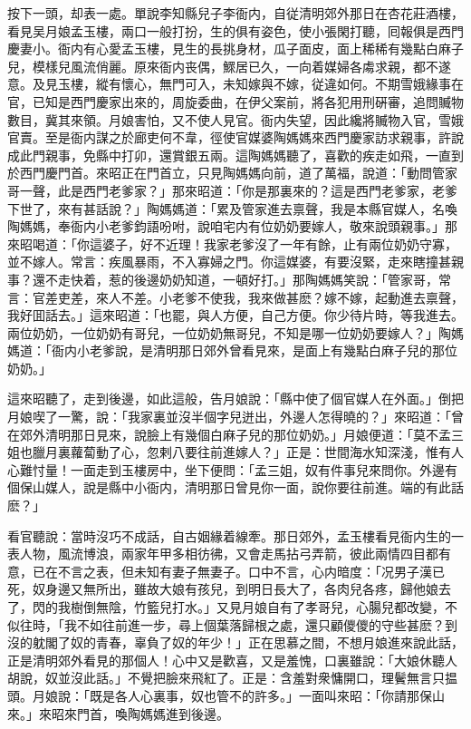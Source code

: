 按下一頭，却表一處。單說李知縣兒子李衙内，自従清明郊外那日在杏花莊酒樓，看見吴月娘孟玉樓，兩口一般打扮，生的俱有姿色，使小張閑打聽，囘報俱是西門慶妻小。衙内有心愛孟玉樓，見生的長挑身材，瓜子面皮，面上稀稀有幾點白麻子兒，模樣兒風流俏麗。原來衙内丧偶，鰥居已久，一向着媒婦各䖏求親，都不遂意。及見玉樓，縱有懷心，無門可入，未知嫁與不嫁，従違如何。不期雪娥緣事在官，已知是西門慶家出來的，周旋委曲，在伊父案前，將各犯用刑硏審，追問贓物數目，冀其來領。月娘害怕，又不使人見官。衙内失望，因此纔將贓物入官，雪娥官賣。至是衙内謀之於廊吏何不韋，徑使官媒婆陶媽媽來西門慶家訪求親事，許說成此門親事，免縣中打卯，還賞銀五兩。這陶媽媽聽了，喜歡的疾走如飛，一直到於西門慶門首。來昭正在門首立，只見陶媽媽向前，道了萬福，說道：「動問管家哥一聲，此是西門老爹家？」那來昭道：「你是那裏來的？這是西門老爹家，老爹下世了，來有甚話說？」陶媽媽道：「累及管家進去禀聲，我是本縣官媒人，名喚陶媽媽，奉衙内小老爹鈞語吩咐，說咱宅内有位奶奶要嫁人，敬來說頭親事。」那來昭喝道：「你這婆子，好不近理！我家老爹沒了一年有餘，止有兩位奶奶守寡，並不嫁人。常言：疾風暴雨，不入寡婦之門。你這媒婆，有要沒緊，走來瞎撞甚親事？還不走快着，惹的後邊奶奶知道，一頓好打。」那陶媽媽笑說：「管家哥，常言：官差吏差，來人不差。小老爹不使我，我來做甚麽？嫁不嫁，起動進去禀聲，我好囬話去。」這來昭道：「也罷，與人方便，自己方便。你少待片時，等我進去。兩位奶奶，一位奶奶有哥兒，一位奶奶無哥兒，不知是哪一位奶奶要嫁人？」陶媽媽道：「衙内小老爹說，是清明那日郊外曾看見來，是面上有幾點白麻子兒的那位奶奶。」

這來昭聽了，走到後邊，如此這般，告月娘說：「縣中使了個官媒人在外面。」倒把月娘喫了一驚，說：「我家裏並沒半個字兒迸出，外邊人怎得曉的？」來昭道：「曾在郊外清明那日見來，說臉上有幾個白麻子兒的那位奶奶。」月娘便道：「莫不孟三姐也臘月裏蘿蔔動了心，忽剌八要往前進嫁人？」正是：世間海水知深淺，惟有人心難忖量！一面走到玉樓房中，坐下便問：「孟三姐，奴有件事兒來問你。外邊有個保山媒人，說是縣中小衙内，清明那日曾見你一面，說你要往前進。端的有此話麽？」

看官聽說：當時沒巧不成話，自古姻緣着線牽。那日郊外，孟玉樓看見衙内生的一表人物，風流博浪，兩家年甲多相彷彿，又會走馬拈弓弄箭，彼此兩情四目都有意，已在不言之表，但未知有妻子無妻子。口中不言，心内暗度：「况男子漢已死，奴身邊又無所出，雖故大娘有孩兒，到明日長大了，各肉兒各疼，歸他娘去了，閃的我樹倒無陰，竹籃兒打水。」又見月娘自有了孝哥兒，心腸兒都改變，不似往時，「我不如往前進一步，尋上個葉落歸根之處，還只顧儍儍的守些甚麽？到沒的躭閣了奴的青春，辜負了奴的年少！」正在思慕之間，不想月娘進來說此話，正是清明郊外看見的那個人！心中又是歡喜，又是羞愧，口裏雖說：「大娘休聽人胡說，奴並沒此話。」不覺把臉來飛紅了。正是：含羞對衆慵開口，理鬢無言只揾頭。月娘說：「既是各人心裏事，奴也管不的許多。」一面叫來昭：「你請那保山來。」來昭來門首，喚陶媽媽進到後邊。

